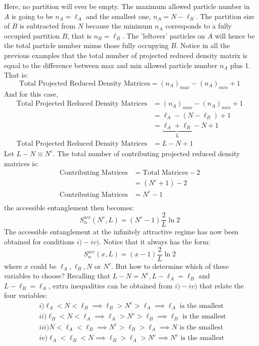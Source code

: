 Here, no partition will ever be empty. The maximum allowed particle number in $A$ is going to be $n_{A} = \ell_{A}$ and the smallest one, $n_{A} = N - \ell_{B}$. The partition size of $B$ is subtracted from $N$ because the minimum $n_A$ corresponds to a fully occupied partition $B$, that is $n_B = \ell_B$. The 'leftover' particles on $A$ will hence be the total particle number minus those fully occupying $B$. Notice in all the previous examples that the total number of projected reduced density matrix is equal to the difference between max and min allowed particle number $n_A$ plus 1. That is:
%
\begin{equation}
\text{Total Projected Reduced Density Matrices} = (n_A)_{max} - (n_A)_{min} + 1
\end{equation}
%
And for this case,
%
 \begin{align}
\text{Total Projected Reduced Density Matrices} &= (n_A)_{max} - (n_A)_{min} + 1 \nonumber \\
&= \ell_A - (N-\ell_B) + 1 \nonumber \\
&= \underbrace{\ell_A + \ell_B}_{L} - N + 1 \nonumber \\
\text{Total Projected Reduced Density Matrices} &= L - N + 1
\end{align}
%
Let $L-N \equiv N^c$. The total number of contributing projected reduced density matrices is:
%
\begin{align}
\text{Contributing Matrices} &= \text{Total Matrices} - 2 \nonumber \\
&= (N^c + 1) - 2 \nonumber \\
\text{Contributing Matrices} &= N^c - 1 \\
\end{align}
%
the accessible entanglement then becomes:
%
\begin{equation}
S_\alpha^{\mathrm acc}(N^c,L) = (N^c - 1) \frac{2}{L} \ln{2}
\end{equation}
%
The accessible entanglement at the infinitely attractive regime has now been obtained for conditions $i)-iv)$. Notice that it always has the form:
%
\begin{equation}
S_\alpha^{\mathrm acc}(x,L) = (x - 1) \frac{2}{L} \ln{2}
\end{equation}
%
where $x$ could be  $\ell_A, \ell_B, N$ or $N^c$. But how to determine which of these variables to choose? Recalling that $L-N = N^c, L-\ell_A = \ell_B$ and $L-\ell_B = \ell_A$, extra inequalities can be obtained from $i)-iv)$ that relate the four variables:
%
\begin{align}
& i) \ell_{A} < N < \ell_{B} \implies \ell_{B} > N^c > \ell_{A} \implies \ell_{A} \text{ is the smallest} \nonumber \\
& ii) \ell_{B} < N < \ell_{A} \implies \ell_{A} > N^c > \ell_{B} \implies \ell_{B} \text{ is the smallest} \nonumber \\
& iii)  N < \ell_{A} < \ell_{B} \implies N^c > \ell_{B} > \ell_{A} \implies N \text{ is the smallest} \nonumber \\
& iv) \ell_{A} < \ell_{B} < N \implies \ell_{B} > \ell_{A} > N^c \implies N^c \text{ is the smallest} \nonumber 
\end{align}
